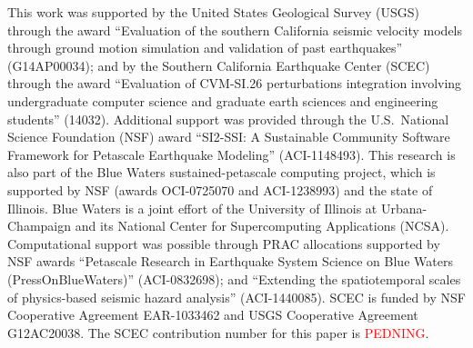 %
\begin{acknowledgments}
% 
This work was supported by the United States Geological Survey (USGS) through the award ``Evaluation of the southern California seismic velocity models through ground motion simulation and validation of past earthquakes'' (G14AP00034); and by the Southern California Earthquake Center (SCEC) through the award ``Evaluation of CVM-SI.26 perturbations integration involving undergraduate computer science and graduate earth sciences and engineering students'' (14032). Additional support was provided through the U.S.~National Science Foundation (NSF) award ``SI2-SSI: A Sustainable Community Software Framework for Petascale Earthquake Modeling'' (ACI-1148493). This research is also part of the Blue Waters sustained-petascale computing project, which is supported by NSF (awards OCI-0725070 and ACI-1238993) and the state of Illinois. Blue Waters is a joint effort of the University of Illinois at Urbana-Champaign and its National Center for Supercomputing Applications (NCSA). Computational support was possible through PRAC allocations supported by NSF awards ``Petascale Research in Earthquake System Science on Blue Waters (PressOnBlueWaters)'' (ACI-0832698); and ``Extending the spatiotemporal scales of physics-based seismic hazard analysis'' (ACI-1440085). SCEC is funded by NSF Cooperative Agreement EAR-1033462 and USGS Cooperative Agreement G12AC20038. The SCEC contribution number for this paper is \textcolor{red}{PEDNING}.
% 
\end{acknowledgments}
